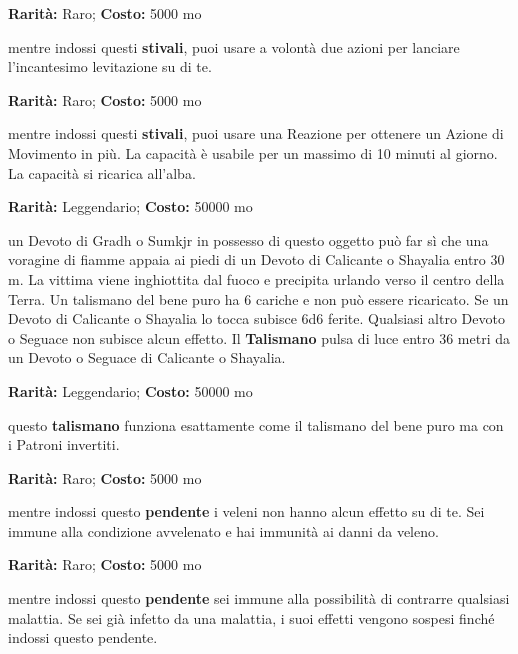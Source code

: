 \begin{multicols}{2}

\textbf{Rarità:} Raro; \textbf{Costo:} 5000 mo

mentre indossi questi \textbf{stivali}, puoi usare a volontà due azioni per lanciare l'incantesimo levitazione su di te.


\textbf{Rarità:} Raro; \textbf{Costo:} 5000 mo

mentre indossi questi \textbf{stivali}, puoi usare una Reazione per ottenere un Azione di Movimento in più. La capacità è usabile per un massimo di 10 minuti al giorno. La capacità si ricarica all'alba.


\textbf{Rarità:} Leggendario; \textbf{Costo:} 50000 mo

un Devoto di Gradh o Sumkjr in possesso di questo oggetto può far sì che una voragine di fiamme appaia ai piedi di un Devoto di Calicante o Shayalia entro 30 m. La vittima viene inghiottita dal fuoco e precipita urlando verso il centro della Terra. Un talismano del bene puro ha 6 cariche e non può essere ricaricato. Se un Devoto di Calicante o Shayalia lo tocca subisce 6d6 ferite. Qualsiasi altro Devoto o Seguace non subisce alcun effetto. Il \textbf{Talismano} pulsa di luce entro 36 metri da un Devoto o Seguace di Calicante o Shayalia.


\textbf{Rarità:} Leggendario; \textbf{Costo:} 50000 mo

questo \textbf{talismano} funziona esattamente come il talismano del bene puro ma con i Patroni invertiti.


\textbf{Rarità:} Raro; \textbf{Costo:} 5000 mo

mentre indossi questo \textbf{pendente} i veleni non hanno alcun effetto su di te. Sei immune alla condizione avvelenato e hai immunità ai danni da veleno.


\textbf{Rarità:} Raro; \textbf{Costo:} 5000 mo

mentre indossi questo \textbf{pendente} sei immune alla possibilità di contrarre qualsiasi malattia. Se sei già infetto da una malattia, i suoi effetti vengono sospesi finché indossi questo pendente.


\end{multicols}
